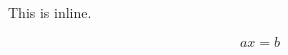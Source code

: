 \documentclass{article}
\title[]{\VAR{title}}
\begin{document}
This is inline.

$$ax = b$$
\end{document}
